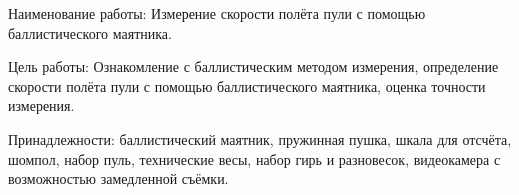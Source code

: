 Наименование работы:
Измерение скорости полёта пули с помощью баллистического маятника.

Цель работы:
Ознакомление с баллистическим методом измерения,
определение скорости полёта пули с помощью баллистического маятника,
оценка точности измерения.

Принадлежности:
баллистический маятник, пружинная пушка, шкала для отсчёта, шомпол,
набор пуль, технические весы, набор гирь и разновесок,
видеокамера с возможностью замедленной съёмки.